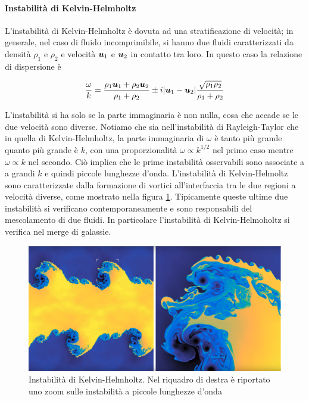 \paragraph{Instabilità di Kelvin-Helmholtz}
L'instabilità di Kelvin-Helmholtz è dovuta ad una stratificazione di velocità; in generale, nel caso di fluido incomprimibile, si hanno due fluidi caratterizzati da densità $\rho_1$ e $\rho_2$ e velocità $\V{u}_1$ e $\V{u}_2$ in contatto tra loro. In questo caso la relazione di dispersione è 
\begin{EQ}
\begin{equation}
\dfrac{\omega}{k} = \dfrac{\rho_1\V{u}_1+\rho_2\V{u}_2}{\rho_1+\rho_2} \pm i |\V{u}_1-\V{u}_2|\dfrac{\sqrt{\rho_1\rho_2}}{\rho_1+\rho_2}
\end{equation}
\end{EQ}
L'instabilità si ha solo se la parte immaginaria è non nulla, cosa che accade se le due velocità sono diverse. Notiamo che sia nell'instabilità di Rayleigh-Taylor che in quella di Kelvin-Helmholtz, la parte immaginaria di $\omega$ è tanto più grande quanto più grande è $k$, con una proporzionalità $\omega\propto k^{1/2}$ nel primo caso mentre $\omega\propto k$ nel secondo. Ciò implica che le prime instabilità osservabili sono associate a a grandi $k$ e quindi piccole lunghezze d'onda. L'instabilità di Kelvin-Helmoltz sono caratterizzate dalla formazione di vortici all'interfaccia tra le due regioni a velocità diverse, come mostrato nella figura \ref{im:KelvinHelmholtz}. Tipicamente queste ultime due instabilità si verificano contemporaneamente e sono responsabili del mescolamento di due fluidi. In particolare l'instabilità di Kelvin-Helmoholtz si verifica nel merge di galassie.
\begin{figure}
\includegraphics[width=\textwidth]{Kelvin}
\caption{Instabilità di Kelvin-Helmholtz. Nel riquadro di destra è riportato uno zoom sulle instabilità a piccole lunghezze d'onda}
\label{im:KelvinHelmholtz}
\end{figure}

